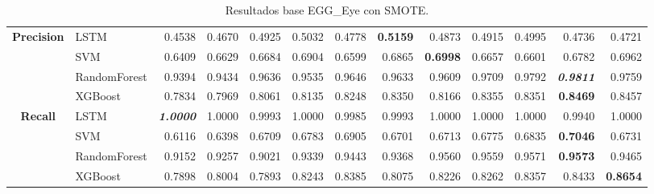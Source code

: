 \begin{table}[H]
\begin{adjustbox}{max width=12cm}
\begin{tabular}{|c|l|r|r|r|r|r|r|r|r|r|r|r|}
			\hline
			\textbf{Precision} &  LSTM &  0.4538 &  0.4670 &  0.4925 &  0.5032 &  0.4778 & \textbf{  0.5159 } &  0.4873 &  0.4915 &  0.4995 &  0.4736 &  0.4721 \\
			&  SVM &  0.6409 &  0.6629 &  0.6684 &  0.6904 &  0.6599 &  0.6865 & \textbf{  0.6998 } &  0.6657 &  0.6601 &  0.6782 &  0.6962 \\
			&  RandomForest &  0.9394 &  0.9434 &  0.9636 &  0.9535 &  0.9646 &  0.9633 &  0.9609 &  0.9709 &  0.9792 & \textit{ \textbf{  0.9811 } } &  0.9759 \\
			&  XGBoost &  0.7834 &  0.7969 &  0.8061 &  0.8135 &  0.8248 &  0.8350 &  0.8166 &  0.8355 &  0.8351 & \textbf{  0.8469 } &  0.8457 \\
			\hline
			\textbf{Recall} &  LSTM & \textit{ \textbf{  1.0000 } } &  1.0000 &  0.9993 &  1.0000 &  0.9985 &  0.9993 &  1.0000 &  1.0000 &  1.0000 &  0.9940 &  1.0000 \\
			&  SVM &  0.6116 &  0.6398 &  0.6709 &  0.6783 &  0.6905 &  0.6701 &  0.6713 &  0.6775 &  0.6835 & \textbf{  0.7046 } &  0.6731 \\
			&  RandomForest &  0.9152 &  0.9257 &  0.9021 &  0.9339 &  0.9443 &  0.9368 &  0.9560 &  0.9559 &  0.9571 & \textbf{  0.9573 } &  0.9465 \\
			&  XGBoost &  0.7898 &  0.8004 &  0.7893 &  0.8243 &  0.8385 &  0.8075 &  0.8226 &  0.8262 &  0.8357 &  0.8433 & \textbf{  0.8654 } \\
			\hline
		\end{tabular}
	\end{adjustbox}
	\caption{Resultados base EGG\_Eye con SMOTE.}
	\label{tab:EGGEyeSMOTE}
\end{table}

